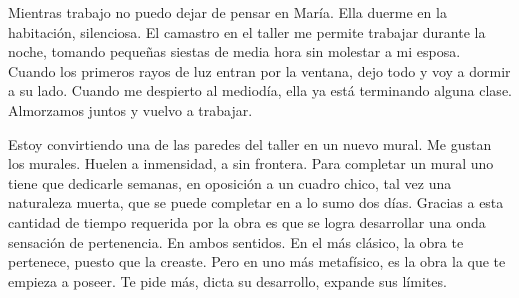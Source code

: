 \documentclass[11pt,twoside,openright,a6paper]{book}
\begin{document}
Mientras trabajo no puedo dejar de pensar en María. Ella duerme en la habitación, silenciosa. El camastro en el taller me permite trabajar durante la noche, tomando pequeñas siestas de media hora sin molestar a mi esposa. Cuando los primeros rayos de luz entran por la ventana, dejo todo y voy a dormir a su lado. Cuando me despierto al mediodía, ella ya está terminando alguna clase. Almorzamos juntos y vuelvo a trabajar.

Estoy convirtiendo una de las paredes del taller en un nuevo mural. Me gustan los murales. Huelen a inmensidad, a sin frontera. Para completar un mural uno tiene que dedicarle semanas, en oposición a un cuadro chico, tal vez una naturaleza muerta, que se puede completar en a lo sumo dos días. Gracias a esta cantidad de tiempo requerida por la obra es que se logra desarrollar una onda sensación de pertenencia. En ambos sentidos. En el más clásico, la obra te pertenece, puesto que la creaste. Pero en uno más metafísico, es la obra la que te empieza a poseer. Te pide más, dicta su desarrollo, expande sus límites.
\end{document}

